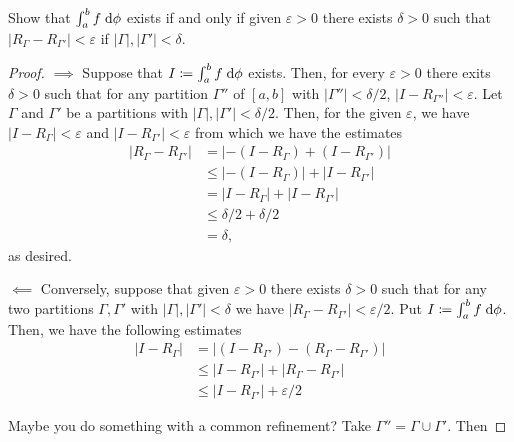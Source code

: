\begin{problem}
Show that $\int_a^bf\;\mathrm{d}\phi$ exists if and only if given $\varepsilon>0$
there exists $\delta>0$ such that
$\left|R_\Gamma-R_{\Gamma'}\right|<\varepsilon$ if
$|\Gamma|,|\Gamma'|<\delta$.
\end{problem}
\begin{proof}
$\implies$ Suppose that $I\coloneqq \int_a^bf\;\mathrm{d}\phi$ exists. Then, for
every $\varepsilon>0$ there exits $\delta>0$ such that for any partition
$\Gamma''$ of $[a,b]$ with $|\Gamma''|<\delta/2$,
$|I-R_{\Gamma''}|<\varepsilon$. Let $\Gamma$ and $\Gamma'$ be a partitions
with $|\Gamma|,|\Gamma'|<\delta/2$. Then, for the given $\varepsilon$, we
have $|I-R_\Gamma|<\varepsilon$ and $|I-R_{\Gamma'}|<\varepsilon$ from
which we have the estimates
\begin{align*}
|R_\Gamma-R_{\Gamma'}|
&=\left|-(I-R_\Gamma)+(I-R_{\Gamma'})\right|\\
&\leq\left|-(I-R_\Gamma)\right|+\left|I-R_{\Gamma'}\right|\\
&=\left|I-R_\Gamma\right|+\left|I-R_{\Gamma'}\right|\\
&\leq\delta/2+\delta/2\\
&=\delta,
\end{align*}
as desired.

$\impliedby$ Conversely, suppose that given $\varepsilon>0$ there exists
$\delta>0$ such that for any two partitions $\Gamma,\Gamma'$ with
$|\Gamma|,|\Gamma'|<\delta$ we have
$|R_\Gamma-R_{\Gamma'}|<\varepsilon/2$. Put $I\coloneqq\int_a^b
f\;\mathrm{d}\phi$. Then, we have the following estimates
\begin{align*}
|I-R_\Gamma|
&=\left|(I-R_{\Gamma'})-(R_{\Gamma}-R_{\Gamma'})\right|\\
&\leq\left|I-R_{\Gamma'}\right|+\left|R_{\Gamma}-R_{\Gamma'}\right|\\
&\leq\left|I-R_{\Gamma'}\right|+\varepsilon/2
\end{align*}

Maybe you do something with a common refinement? Take
$\Gamma''=\Gamma\cup\Gamma'$. Then
\end{proof}
\newpage

